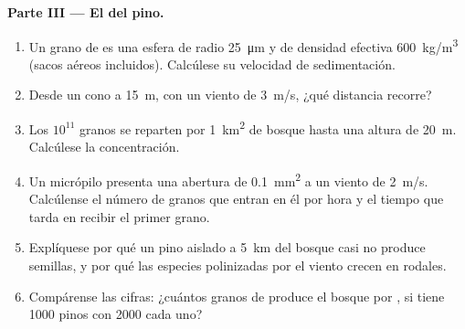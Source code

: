 \begin{problem}
\medskip
\noindent\textbf{Parte III --- El  del pino.}
\begin{enumerate}[resume]
  \item Un grano de  es una esfera de radio \qty{25}{\micro m} y de
        densidad efectiva \qty{600}{kg/m^3} (sacos aéreos incluidos).
        Calcúlese su velocidad de sedimentación.
  \item Desde un cono a \qty{15}{m}, con un viento de \qty{3}{m/s}, ¿qué
        distancia recorre?
  \item Los $10^{11}$ granos se reparten por \qty{1}{km^2} de bosque
        hasta una altura de \qty{20}{m}. Calcúlese la concentración.
  \item Un micrópilo presenta una abertura de \qty{0.1}{mm^2} a un viento
        de \qty{2}{m/s}. Calcúlense el número de granos que entran en él
        por hora y el tiempo que tarda en recibir el primer grano.
  \item Explíquese por qué un pino aislado a \qty{5}{km} del bosque casi
        no produce semillas, y por qué las especies polinizadas por el
        viento crecen en rodales.
  \item Compárense las cifras: ¿cuántos granos de  produce el bosque
        por , si tiene \num{1000} pinos con \num{2000}  cada
        uno?
\end{enumerate}


\end{problem}
